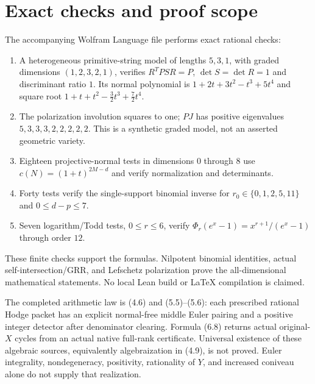 \documentclass[11pt]{article}
\begin{document}
\section{Exact checks and proof scope}
The accompanying Wolfram Language file performs exact rational checks:
\begin{enumerate}
\item A heterogeneous primitive-string model of lengths $5,3,1$,
with graded dimensions $(1,2,3,2,1)$, verifies
$R^TPSR=P$, $\det S=\det R=1$ and discriminant ratio $1$.
Its normal polynomial is $1+2t+3t^2-t^3+5t^4$ and square root
$1+t+t^2-\tfrac32t^3+\tfrac72t^4$.
\item The polarization involution squares to one; $PJ$ has
positive eigenvalues $5,3,3,3,2,2,2,2,2$.
This is a synthetic graded model, not an asserted geometric variety.
\item Eighteen projective-normal tests in dimensions $0$ through $8$
use $c(N)=(1+t)^{2M-d}$ and verify normalization and determinants.
\item Forty tests verify the single-support binomial inverse for
$r_0\in\{0,1,2,5,11\}$ and $0\le d-p\le7$.
\item Seven logarithm/Todd tests, $0\le r\le6$, verify
$\Phi_r(e^x-1)=x^{r+1}/(e^x-1)$ through order $12$.
\end{enumerate}
These finite checks support the formulas. Nilpotent binomial
identities, actual self-intersection/GRR, and Lefschetz polarization
prove the all-dimensional mathematical statements.
No local Lean build or LaTeX compilation is claimed.

The completed arithmetic law is (4.6) and (5.5)--(5.6):
each prescribed rational Hodge packet has an explicit normal-free
middle Euler pairing and a positive integer detector after
denominator clearing. Formula (6.8) returns actual original-$X$
cycles from an actual native full-rank certificate.
Universal existence of these algebraic sources, equivalently
algebraization in (4.9), is not proved.
Euler integrality, nondegeneracy, positivity, rationality of $Y$,
and increased coniveau alone do not supply that realization.
\end{document}
